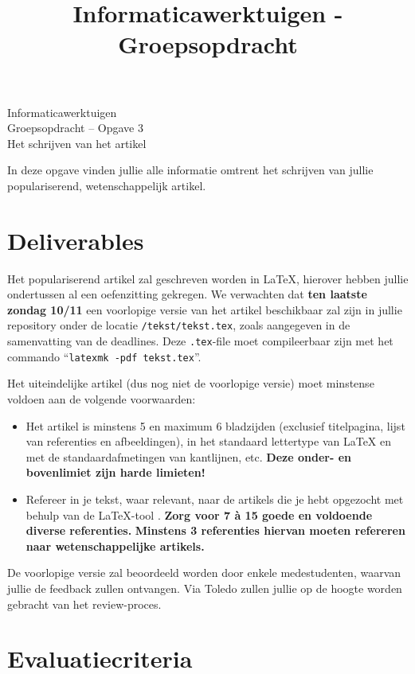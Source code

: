 \documentclass[a4paper]{article}
\title{Informaticawerktuigen - Groepsopdracht}
\begin{document}
\begin{center}
  \huge Informaticawerktuigen \\
  \Huge Groepsopdracht -- Opgave 3 \\
  \huge Het schrijven van het artikel
\end{center}
\vspace{1em}

In deze opgave vinden jullie alle informatie omtrent het schrijven van jullie populariserend, wetenschappelijk artikel.


\section{Deliverables}

Het populariserend artikel zal geschreven worden in \LaTeX{}, hierover hebben jullie ondertussen al een oefenzitting gekregen.
We verwachten dat \textbf{ten laatste zondag 10/11} een voorlopige versie van het artikel beschikbaar zal zijn in jullie repository onder de locatie \texttt{/tekst/tekst.tex}, zoals aangegeven in de samenvatting van de deadlines.
Deze \texttt{.tex}-file moet compileerbaar zijn met het commando ``\texttt{latexmk -pdf tekst.tex}''.

Het uiteindelijke artikel (dus nog niet de voorlopige versie) moet minstense voldoen aan de volgende voorwaarden:
\begin{itemize}
	\item
		Het artikel is minstens 5 en maximum 6 bladzijden (exclusief titelpagina, lijst van referenties en afbeeldingen), in het standaard lettertype van \LaTeX{} en met de standaardafmetingen van kantlijnen, etc.
		\textbf{Deze onder- en bovenlimiet zijn harde limieten!}
	\item
		Refereer in je tekst, waar relevant, naar de artikels die je hebt opgezocht met behulp van de \LaTeX{}-tool \BibTeX{}.
		\textbf{Zorg voor 7 \`a 15 goede en voldoende diverse referenties.}
		\textbf{Minstens 3 referenties hiervan moeten refereren naar wetenschappelijke artikels.}
\end{itemize}

De voorlopige versie zal beoordeeld worden door enkele medestudenten, waarvan jullie de feedback zullen ontvangen.
Via Toledo zullen jullie op de hoogte worden gebracht van het review-proces.


\section{Evaluatiecriteria}
\end{document}
